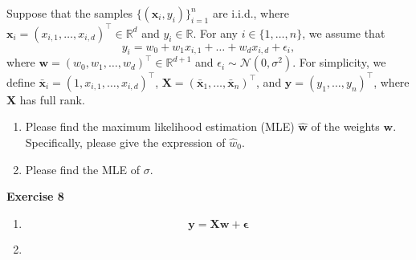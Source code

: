 \documentclass[11pt,letter,notitlepage]{article}
\begin{document}
\newpage



\begin{exercise}\label{Exe5}
Suppose that the samples $\{(\mathbf{x}_i,y_i)\}^n_{i=1}$ are i.i.d., where $\mathbf{x}_i =(x_{i,1}, \dots, x_{i,d})^{\top} \in \mathbb{R}^d$  and $y_i \in \mathbb{R}$. For any $i\in \{1,\dots, n\}$, we assume that 
$$y_i =  w_0 + w_1 x_{i,1} +\dots + w_d x_{i,d} + \epsilon_i,$$
where $\mathbf{w} = (w_0,w_1,\dots,w_d)^{\top}\in \mathbb{R}^{d+1}$ and $\epsilon_i\sim \mathcal{N}(0,\sigma^2)$. For simplicity, we define $\bar{\mathbf{x}}_i = (1, x_{i,1}, \dots, x_{i,d})^\top$, $ \mathbf{X}=(\bar{\mathbf{x}}_1,\dots,\bar{\mathbf{x}}_n)^\top$, and $\mathbf{y}=(y_1,\dots,y_n)^\top$, where $\mathbf{X}$ has full rank.
\begin{enumerate}
    \item Please find the maximum likelihood estimation (MLE) $\hat{\mathbf{w}}$ of the weights $\mathbf{w}$. Specifically, please give the expression of $\hat{w}_0$.
    \item Please find the MLE of $\sigma$.
\end{enumerate}
\end{exercise}

\begin{solution}
	\textbf{Exercise 8}
	\begin{enumerate}
		\item
		\[\mathbf{y=Xw+\epsilon}\]
		\item 
	\end{enumerate}
\end{solution}

\newpage
\end{document}
